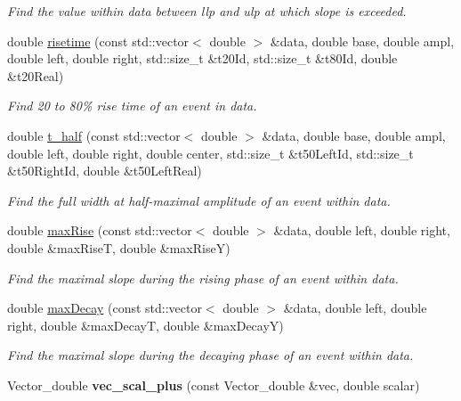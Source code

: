 \begin{DoxyCompactItemize}
\begin{DoxyCompactList}\small\item\em Find the value within {\itshape data\/} between {\itshape llp\/} and {\itshape ulp\/} at which {\itshape slope\/} is exceeded. \item\end{DoxyCompactList}\item 
double \hyperlink{group__stfgen_gada6c5911cfc604b337b76d1198d8cd37}{risetime} (const std::vector$<$ double $>$ \&data, double base, double ampl, double left, double right, std::size\_\-t \&t20Id, std::size\_\-t \&t80Id, double \&t20Real)
\begin{DoxyCompactList}\small\item\em Find 20 to 80\% rise time of an event in {\itshape data\/}. \item\end{DoxyCompactList}\item 
double \hyperlink{group__stfgen_ga7c43d9ceb4e7ce199c0278b52e28386d}{t\_\-half} (const std::vector$<$ double $>$ \&data, double base, double ampl, double left, double right, double center, std::size\_\-t \&t50LeftId, std::size\_\-t \&t50RightId, double \&t50LeftReal)
\begin{DoxyCompactList}\small\item\em Find the full width at half-\/maximal amplitude of an event within {\itshape data\/}. \item\end{DoxyCompactList}\item 
double \hyperlink{group__stfgen_ga3fe029fabcdd9669244b896cd57fede3}{maxRise} (const std::vector$<$ double $>$ \&data, double left, double right, double \&maxRiseT, double \&maxRiseY)
\begin{DoxyCompactList}\small\item\em Find the maximal slope during the rising phase of an event within {\itshape data\/}. \item\end{DoxyCompactList}\item 
double \hyperlink{group__stfgen_ga7aea0ee12af70b3eb64016585df82eeb}{maxDecay} (const std::vector$<$ double $>$ \&data, double left, double right, double \&maxDecayT, double \&maxDecayY)
\begin{DoxyCompactList}\small\item\em Find the maximal slope during the decaying phase of an event within {\itshape data\/}. \item\end{DoxyCompactList}\item 
\hypertarget{group__stfgen_ga8fefeddc3e296792aeb1c4169bcf6992}{
Vector\_\-double {\bfseries vec\_\-scal\_\-plus} (const Vector\_\-double \&vec, double scalar)}
\label{group__stfgen_ga8fefeddc3e296792aeb1c4169bcf6992}


\end{DoxyCompactItemize}
